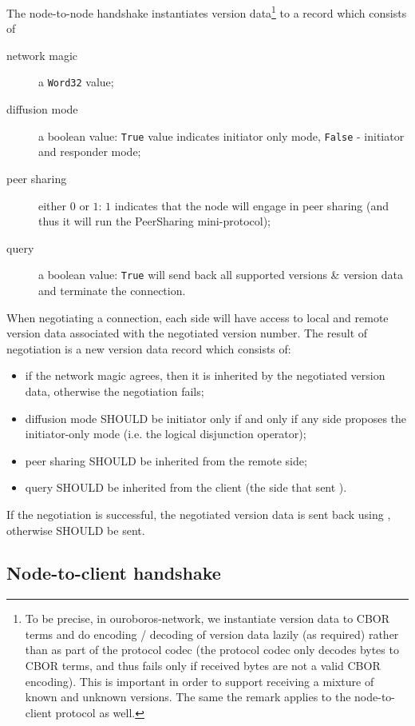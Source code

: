 The node-to-node handshake instantiates version data\footnote{To be precise, in
ouroboros-network, we instantiate version data to CBOR terms and do encoding
/ decoding of version data lazily (as required) rather than as part of the
protocol codec (the protocol codec only decodes bytes to CBOR terms, and thus
fails only if received bytes are not a valid CBOR encoding).  This is important
in order to support receiving a mixture of known and unknown versions. The same
the remark applies to the node-to-client protocol as well.} to a record which consists
of
\begin{description}
  \item[network magic] a \texttt{Word32} value;
  \item[diffusion mode] a boolean value: \texttt{True} value indicates
    initiator only mode, \texttt{False} - initiator and responder mode;
  \item[peer sharing] either $0$ or $1$: $1$ indicates that the node
    will engage in peer sharing (and thus it will run the PeerSharing
    mini-protocol);
  \item[query] a boolean value: \texttt{True} will send back all supported
    versions \& version data and terminate the connection.
\end{description}

When negotiating a connection, each side will have access to local and remote
version data associated with the negotiated version number.  The result of
negotiation is a new version data record which consists of:
\begin{itemize}\label{alg:node-to-node-negotiation}
  \item if the network magic agrees, then it is inherited by the negotiated version
    data, otherwise the negotiation fails;
  \item diffusion mode SHOULD be initiator only if and only if any side proposes the
    initiator-only mode (i.e. the logical disjunction operator);
  \item peer sharing SHOULD be inherited from the remote side;
  \item query SHOULD be inherited from the client (the side that sent
      \MsgProposeVersions{}).
\end{itemize}
If the negotiation is successful, the negotiated version data is sent back
using \MsgAcceptVersion{}, otherwise \MsgRefuse{} SHOULD be sent.

\subsection{Node-to-client handshake}

